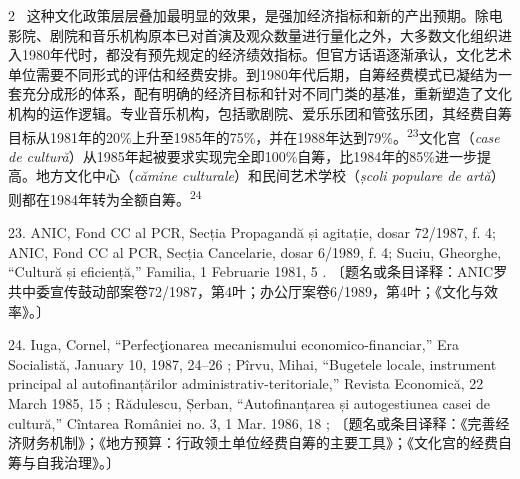 \documentclass[10pt,a4paper]{article}
\begin{document}
\begin{paracol}{2}
\switchcolumn*
{\scriptsize\color{gray} [p. 8]}\ 这种文化政策层层叠加最明显的效果，是强加经济指标和新的产出预期。除电影院、剧院和音乐机构原本已对首演及观众数量进行量化之外，大多数文化组织进入1980年代时，都没有预先规定的经济绩效指标。但官方话语逐渐承认，文化艺术单位需要不同形式的评估和经费安排。到1980年代后期，自筹经费模式已凝结为一套充分成形的体系，配有明确的经济目标和针对不同门类的基准，重新塑造了文化机构的运作逻辑。专业音乐机构，包括歌剧院、爱乐乐团和管弦乐团，其经费自筹目标从1981年的20\%上升至1985年的75\%，并在1988年达到79\%。\nobreak\textsuperscript{23}文化宫（\textit{case de cultură}）从1985年起被要求实现完全即100\%自筹，比1984年的85\%进一步提高。地方文化中心（\textit{cămine culturale}）和民间艺术学校（\textit{școli populare de artă}）则都在1984年转为全额自\mbox{筹。\textsuperscript{24}}\par{\small 23. ANIC, Fond CC al PCR, Secția Propagandă și agitație, dosar 72/1987, f. 4; ANIC, Fond CC al PCR, Secția Cancelarie, dosar 6/1989, f. 4; Suciu, Gheorghe, “Cultură și eficiență,” Familia, 1 Februarie 1981, 5 . 〔题名或条目译释：ANIC罗共中委宣传鼓动部案卷72/1987，第4叶；办公厅案卷6/1989，第4叶；《文化与效率》。〕\par}{\small 24. Iuga, Cornel, “Perfecţionarea mecanismului economico-financiar,” Era Socialistă, January 10, 1987, 24–26 ; Pîrvu, Mihai, “Bugetele locale, instrument principal al autofinanțărilor administrativ-teritoriale,” Revista Economică, 22 March 1985, 15 ; Rădulescu, Șerban, “Autofinanțarea și autogestiunea casei de cultură,” Cîntarea României no. 3, 1 Mar. 1986, 18 ; 〔题名或条目译释：《完善经济财务机制》；《地方预算：行政领土单位经费自筹的主要工具》；《文化宫的经费自筹与自我治理》。〕\par}
\switchcolumn

\end{paracol}
\end{document}
